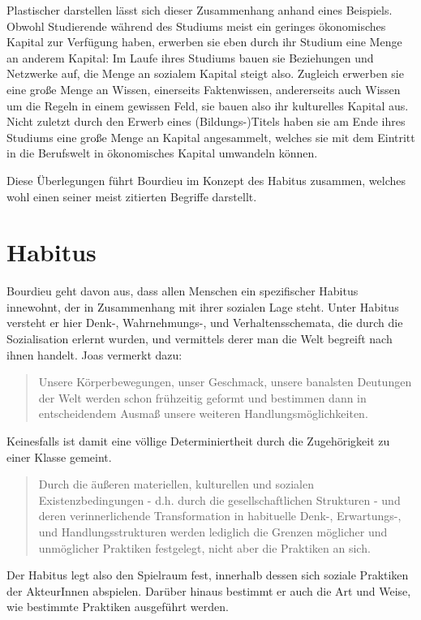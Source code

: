 \documentclass[a4paper, german, oneside]{scrbook}
\begin{document}
Plastischer darstellen lässt sich dieser Zusammenhang anhand eines Beispiels. Obwohl Studierende während des Studiums meist ein geringes ökonomisches Kapital zur Verfügung haben, erwerben sie eben durch ihr Studium eine Menge an anderem Kapital: Im Laufe ihres Studiums bauen sie Beziehungen und Netzwerke auf, die Menge an sozialem Kapital steigt also. Zugleich erwerben sie eine große Menge an Wissen, einerseits Faktenwissen, andererseits auch Wissen um die Regeln in einem gewissen Feld, sie bauen also ihr kulturelles Kapital aus. Nicht zuletzt durch den Erwerb eines (Bildungs-)Titels haben sie am Ende ihres Studiums eine große Menge an Kapital angesammelt, welches sie mit dem Eintritt in die Berufswelt in ökonomisches Kapital umwandeln können.

Diese Überlegungen führt Bourdieu im Konzept des Habitus zusammen, welches wohl einen seiner meist zitierten Begriffe darstellt.


\section{Habitus}
\label{habitus}
Bourdieu geht davon aus, dass allen Menschen ein spezifischer Habitus innewohnt, der in Zusammenhang mit ihrer sozialen Lage steht. Unter Habitus versteht er hier Denk-, Wahrnehmungs-, und Verhaltensschemata, die durch die Sozialisation erlernt wurden, und vermittels derer man die Welt begreift nach ihnen handelt. Joas vermerkt dazu: \blockquote[{\cite[533]{joas_sozialtheorie:_2004}}]{Unsere Körperbewegungen, unser Geschmack, unsere banalsten Deutungen der Welt werden schon frühzeitig geformt und bestimmen dann in entscheidendem Ausmaß unsere weiteren Handlungsmöglichkeiten.} Keinesfalls ist damit eine völlige Determiniertheit durch die Zugehörigkeit zu einer Klasse gemeint. \blockquote[{\cite[69]{schwingel_pierre_2009}}]{Durch die äußeren materiellen, kulturellen und sozialen Existenzbedingungen - d.h. durch die gesellschaftlichen Strukturen - und deren verinnerlichende Transformation in habituelle Denk-, Erwartungs-, und Handlungsstrukturen werden lediglich die Grenzen möglicher und unmöglicher Praktiken festgelegt, nicht aber die Praktiken an sich.}

Der Habitus legt also den Spielraum fest, innerhalb dessen sich soziale Praktiken der AkteurInnen abspielen. Darüber hinaus bestimmt er auch die Art und Weise, wie bestimmte Praktiken ausgeführt werden.

\end{document}
